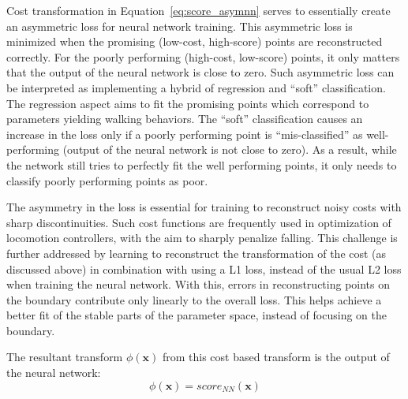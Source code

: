 Cost transformation in Equation~\ref{eq:score_asymnn} serves to essentially create an asymmetric loss for neural network training. This asymmetric loss is minimized when the promising (low-cost, high-score) points are reconstructed correctly.
For the poorly performing (high-cost, low-score) points, it only matters that the output of the neural network is close to zero. Such asymmetric loss can be interpreted as implementing a hybrid of regression and ``soft'' classification. The regression aspect aims to fit the promising points which correspond to parameters yielding walking behaviors. The ``soft'' classification causes an increase in the loss only if a poorly performing point is ``mis-classified'' as well-performing (output of the neural network is not close to zero). As a result, while the network still tries to perfectly fit the well performing points, it only needs to classify poorly performing points as poor.

The asymmetry in the loss is essential for training to reconstruct noisy costs with sharp discontinuities. Such cost functions are frequently used in optimization of locomotion controllers, with the aim to sharply penalize falling. This challenge is further addressed by learning to reconstruct the transformation of the cost (as discussed above) in combination with using a L1 loss, instead of the usual L2 loss when training the neural network. With this, errors in reconstructing points on the boundary contribute only linearly to the overall loss. This helps achieve a better fit of the stable parts of the parameter space, instead of focusing on the boundary.

The resultant transform $\phi(\pmb{x})$ from this cost based transform is the output of the neural network:
\begin{equation}
    \phi(\pmb{x}) = score_{NN}(\pmb{x})
\end{equation}


